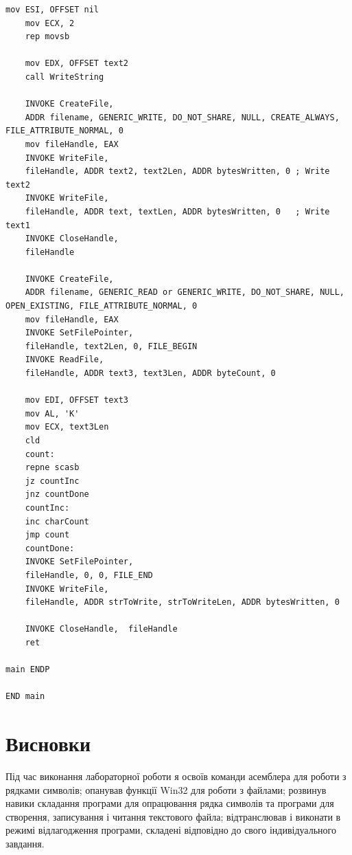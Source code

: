 \documentclass{article}
\begin{document}
\begin{normalsize}
\begin{lstlisting}[language={[x86masm]Assembler}]
	mov ESI, OFFSET nil
	mov ECX, 2
	rep movsb
	
	mov EDX, OFFSET text2
	call WriteString
	
	INVOKE CreateFile,  
	ADDR filename, GENERIC_WRITE, DO_NOT_SHARE, NULL, CREATE_ALWAYS, FILE_ATTRIBUTE_NORMAL, 0
	mov fileHandle, EAX
	INVOKE WriteFile,
	fileHandle, ADDR text2, text2Len, ADDR bytesWritten, 0 ; Write text2
	INVOKE WriteFile,
	fileHandle, ADDR text, textLen, ADDR bytesWritten, 0   ; Write text1
	INVOKE CloseHandle, 
	fileHandle
	
	INVOKE CreateFile,           
	ADDR filename, GENERIC_READ or GENERIC_WRITE, DO_NOT_SHARE, NULL, OPEN_EXISTING, FILE_ATTRIBUTE_NORMAL, 0
	mov fileHandle, EAX
	INVOKE SetFilePointer,             
	fileHandle, text2Len, 0, FILE_BEGIN
	INVOKE ReadFile,
	fileHandle, ADDR text3, text3Len, ADDR byteCount, 0
	
	mov EDI, OFFSET text3
	mov AL, 'K'
	mov ECX, text3Len
	cld  
	count: 
	repne scasb
	jz countInc
	jnz countDone
	countInc:
	inc charCount
	jmp count
	countDone:
	INVOKE SetFilePointer,
	fileHandle, 0, 0, FILE_END
	INVOKE WriteFile,
	fileHandle, ADDR strToWrite, strToWriteLen, ADDR bytesWritten, 0
	
	INVOKE CloseHandle,  fileHandle
	ret

main ENDP

END main
	\end{lstlisting}


	\section*{Висновки}
	Під час виконання лабораторної роботи я освоїв команди асемблера для роботи з рядками символів; опанував функції Win32 для роботи з файлами; розвинув навики складання програми для опрацювання рядка символів та програми для створення, записування і читання текстового файла; відтранслював і виконати в режимі відлагодження програми, складені відповідно до свого індивідуального завдання.
	    
\end{normalsize}
\end{document}
